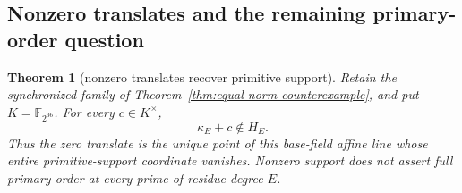 \documentclass[11pt]{article}
\newtheorem{theorem}{Theorem}[section]
\theoremstyle{definition}
\theoremstyle{remark}
\begin{document}
\subsection{Nonzero translates and the remaining primary-order question}

\begin{theorem}[nonzero translates recover primitive support]
\label{thm:equal-norm-translates}
Retain the synchronized family of
Theorem~\ref{thm:equal-norm-counterexample}, and put
$K=\mathbb F_{2^{36}}$.  For every $c\in K^\times$,
\[
 \kappa_E+c\notin H_E.
\]
Thus the zero translate is the unique point of this base-field affine line
whose entire primitive-support coordinate vanishes.  Nonzero support does
not assert full primary order at every prime of residue degree $E$.
\end{theorem}
\end{document}
